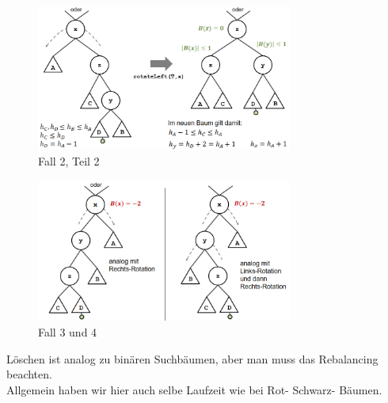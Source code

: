 \documentclass{article}
\begin{document}
            \begin{figure}[ht]
                \centering
                \includegraphics[width=0.75\textwidth]{Bilder/AVLRF2II.png}
                \caption{Fall 2, Teil 2}
                \label{fig:AVLRF2II}
            \end{figure}
            \begin{figure}[ht]
                \centering
                \includegraphics[width=0.75\textwidth]{Bilder/AVLRF3_4.png}
                \caption{Fall 3 und 4}
                \label{fig:AVLRF3_4}
            \end{figure}
            \newpage
            Löschen ist analog zu binären Suchbäumen, aber man muss das Rebalancing beachten.\\
            Allgemein haben wir hier auch selbe Laufzeit wie bei Rot- Schwarz- Bäumen.
\end{document}
